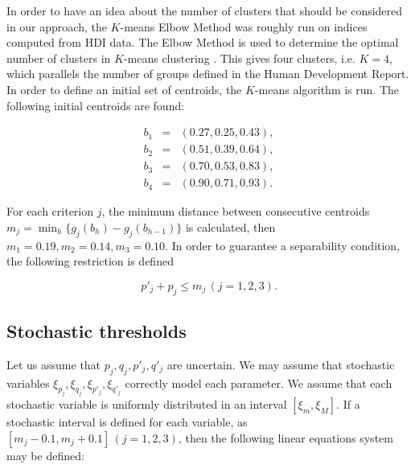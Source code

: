 \documentclass[]{elsarticle}
\theoremstyle{definition}
\begin{document}
In order to have an idea about the number of clusters that should be considered in our approach, the $K$-means Elbow Method was roughly run on indices computed from HDI data. The Elbow Method is used to determine the optimal number of clusters in $K$-means clustering \citep{Ketchen1996}. This gives four clusters,    i.e. $K=4$, which parallels the number of groups defined in the Human Development Report. In order to define an initial set of centroids, the $K$-means algorithm is run.   The following initial centroids are found:

\begin{eqnarray}
b_1&=&(0.27, 0.25, 0.43), \nonumber\\
b_2&=&(0.51, 0.39, 0.64), \nonumber\\
b_3&=&(0.70, 0.53, 0.83), \nonumber\\
b_4&=&(0.90, 0.71, 0.93). \nonumber
\end{eqnarray}

\noindent
For each criterion $j$, the minimum distance between consecutive centroids $m_j=\min_{h} \{g_j(b_h)-g_j(b_{h-1})\}$ is calculated, then $m_1=0.19, m_2=0.14, m_3=0.10$. In order to guarantee a separability condition, the following restriction is defined

\begin{equation}
p'_j+p_j \leq m_j \, (j=1,2,3). \label{thresholds}
\end{equation}



\subsection{Stochastic thresholds}

Let us assume that  $p_j,q_j,p'_j,q'_j$ are uncertain.  We may assume that stochastic variables $\xi_{p_j},\xi_{q_j},\xi_{p'_j},\xi_{q'_j}$ correctly model each parameter. We assume that each stochastic variable is uniformly distributed in an interval  $[\xi_m, \xi_M]$. If a stochastic interval is defined for each variable, as $[m_j-0.1, m_j+0.1] \,(j=1,2,3)$, then the following linear equations system may be defined:
\end{document}
